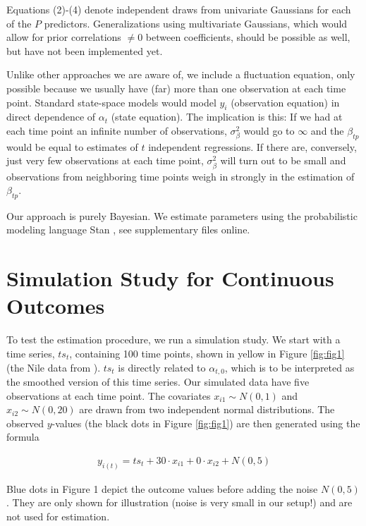 \documentclass{article}
\begin{document}
Equations (2)-(4) denote independent draws from univariate Gaussians for each of the $P$ predictors. Generalizations using multivariate Gaussians, which would allow for prior correlations $\neq 0$ between coefficients, should be possible as well, but have not been implemented yet.

Unlike other approaches we are aware of, we include a fluctuation equation, only possible because we usually have (far) more than one observation at each time point. Standard state-space models would model $y_i$ (observation equation) in direct dependence of $\alpha_t$ (state equation). The implication is this: If we had at each time point an infinite number of observations, $\sigma^2_\beta$ would go to $\infty$ and the $\beta_{tp}$ would be equal to estimates of $t$ independent regressions. If there are, conversely, just very few observations at each time point, $\sigma^2_\beta$ will turn out to be small and observations from neighboring time points weigh in strongly in the estimation of $\beta_{tp}$.

Our approach is purely Bayesian. We estimate parameters using the probabilistic modeling language Stan \citep{stan_development_team_rstan_2021}, see supplementary files online.

\section{Simulation Study for Continuous Outcomes}

To test the estimation procedure, we run a simulation study. We start with a time series, $ts_t$, containing 100 time points, shown in yellow in Figure \ref{fig:fig1} (the Nile data from \citep{durbin_time_2012}). $ts_t$ is directly related to $\alpha_{t,0}$, which is to be interpreted as the smoothed version of this time series. Our simulated data have five observations at each time point. The covariates $x_{i1} \sim N(0,1)$ and $x_{i2} \sim N(0, 20)$ are drawn from two independent normal distributions. The observed $y$-values (the black dots in Figure \ref{fig:fig1}) are then generated using the formula

\begin{align}
y_{i(t)} = ts_t + 30 \cdot x_{i1} + 0 \cdot x_{i2} + N(0, 5)    
\end{align}

Blue dots in Figure 1 depict the outcome values before adding the noise $N(0, 5)$. They are only shown for illustration (noise is very small in our setup!) and are not used for estimation.
\end{document}

